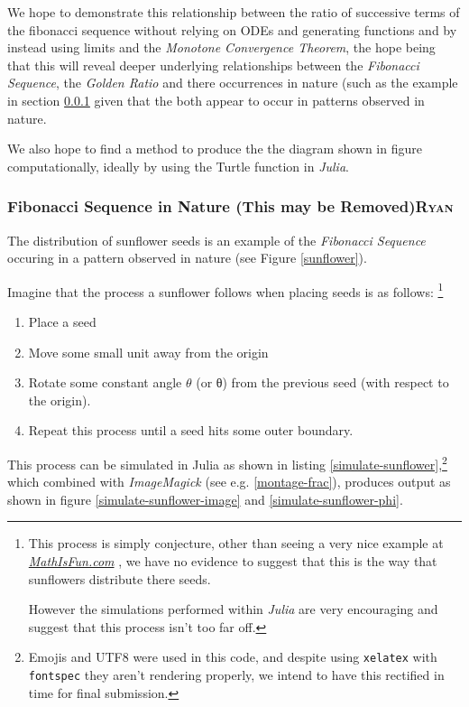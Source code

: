 \documentclass[a4paper,11pt,twoside]{article}
\begin{document}
We hope to demonstrate this relationship between the ratio of successive terms
of the fibonacci sequence without relying on ODEs and generating functions and
by instead using limits and the \emph{Monotone Convergence Theorem}, the hope being
that this will reveal deeper underlying relationships between the \emph{Fibonacci
Sequence}, the \emph{Golden Ratio} and there occurrences in nature (such as the
example in section \ref{sunflower-example} given that the both appear to occur in
patterns observed in nature.

We also hope to find a method to produce the the diagram shown in figure
computationally, ideally by using the Turtle function in \emph{Julia}.

\subsubsection{Fibonacci Sequence in Nature (This may be Removed)\hfill{}\textsc{Ryan}}
\label{sunflower-example}
The distribution of sunflower seeds is an example of the \emph{Fibonacci Sequence}
occuring in a pattern observed in nature (see Figure \ref{sunflower}).

Imagine that the process a sunflower follows when placing seeds is as follows: \footnote{This process is simply conjecture, other than seeing a very nice example at \href{https://www.mathsisfun.com/numbers/nature-golden-ratio-fibonacci.html}{\emph{MathIsFun.com}}
\cite{NatureGoldenRatio2018}, we have no evidence to suggest that this is the way
that sunflowers distribute there seeds.

However the simulations performed within \emph{Julia} are very encouraging and
suggest that this process isn't too far off.}

\begin{enumerate}
\item Place a seed
\item Move some small unit away from the origin
\item Rotate some constant angle \(\mathtt{\theta}\) (or θ) from the previous seed (with respect to the origin).
\item Repeat this process until a seed hits some outer boundary.
\end{enumerate}

This process can be simulated in Julia \cite{bezansonJuliaFreshApproach2017} as shown in listing \ref{simulate-sunflower},\footnote{Emojis and UTF8 were used in this code, and despite using \texttt{xelatex} with \texttt{fontspec} they aren't rendering properly, we intend to have this rectified in time for final submission.} which combined with \emph{ImageMagick} (see e.g. \ref{montage-frac}), produces output as shown in figure \ref{simulate-sunflower-image} and \ref{simulate-sunflower-phi}.
\end{document}
